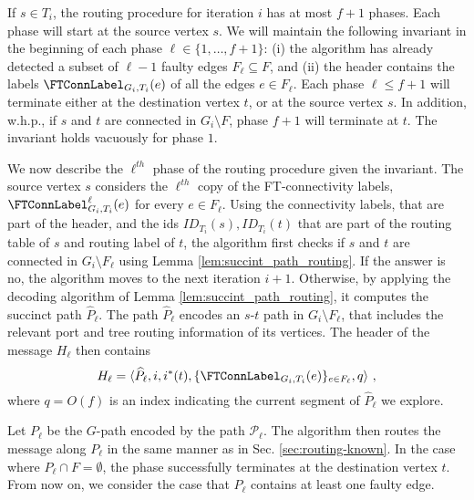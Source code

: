 If $s \in T_i$, the routing procedure for iteration $i$ has at most $f+1$ phases. Each phase will start at the source vertex $s$. We will maintain the following invariant in the beginning of each phase $\ell \in \{1,\ldots, f+1\}$: (i) the algorithm has already detected a subset of $\ell-1$ faulty edges $F_\ell \subseteq F$, and (ii) the header contains the labels $\FTConnLabel_{G_i,T_i}(e)$ of all the edges $e \in F_\ell$. Each phase $\ell \leq f+1$ will terminate either at the destination vertex $t$, or at the source vertex $s$. In addition, w.h.p., if $s$ and $t$ are connected in $G_i \setminus F$, phase $f+1$ will terminate at $t$. The invariant holds vacuously for phase $1$.

We now describe the $\ell^{th}$ phase of the routing procedure given the invariant. The source vertex $s$ considers the $\ell^{th}$ copy of the FT-connectivity labels, $\FTConnLabel^{\ell}_{G_i,T_i}(e)$ for every $e \in F_\ell$. 
Using the connectivity labels, that are part of the header, and the ids $ID_{T_i}(s),ID_{T_i}(t)$ that are part of the routing table of $s$ and routing label of $t$, the algorithm first checks if $s$ and $t$ are connected in $G_i \setminus F_\ell$ using Lemma \ref{lem:succint_path_routing}. If the answer is no, the algorithm moves to the next iteration $i+1$.
Otherwise, by applying the decoding algorithm of Lemma \ref{lem:succint_path_routing}, it computes the succinct path $\widehat{P}_\ell$. The path $\widehat{P}_\ell$ encodes an $s$-$t$ path in $G_i \setminus F_\ell$, that includes the relevant port and tree routing information of its vertices. The header of the message $H_\ell$ then contains 
$$H_\ell=\langle \widehat{P}_\ell, i, i^*(t), \{\FTConnLabel_{G_i,T_i}(e)\}_{e \in F_{\ell}}, q \rangle~,$$ where $q = O(f)$ is an index indicating the current segment of $\widehat{P}_\ell$ we explore. 


 
Let $P_\ell$ be the $G$-path encoded by the path $\mathcal{P}_\ell$. The algorithm then routes the message along $P_\ell$ in the same manner as in Sec. \ref{sec:routing-known}. In the case where $P_{\ell}\cap F=\emptyset$, the phase successfully terminates at the destination vertex $t$. From now on, we consider the case that $P_{\ell}$ contains at least one faulty edge. 

